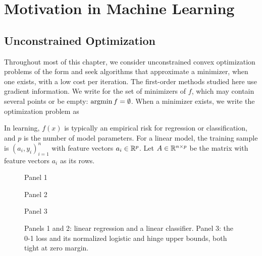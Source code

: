 
\section{Motivation in Machine Learning}

\subsection{Unconstrained Optimization}

Throughout most of this chapter, we consider unconstrained convex optimization problems of the form
and seek algorithms that approximate a minimizer, when one exists, with a low cost per iteration.
%
The first-order methods studied here use gradient information. We write
for the set of minimizers of $f$, which may contain several points or be empty: $\operatorname{argmin} f = \emptyset$. When a minimizer exists, we write the optimization problem as


In learning, $f(x)$ is typically an empirical risk for regression or classification, and $p$ is the number of model parameters. For a linear model, the training sample is $(a_i,y_i)_{i=1}^n$ with feature vectors $a_i \in \mathbb{R}^p$.
%
Let $A \in \mathbb{R}^{n \times p}$ be the matrix with feature vectors $a_i$ as its rows.


\begin{figure}[tbp]
\centering
{\small\sffamily\color{BookMuted}Panel 1\par}\smallskip
{}
\par\medskip
{\small\sffamily\color{BookMuted}Panel 2\par}\smallskip
{}
\par\medskip
{\small\sffamily\color{BookMuted}Panel 3\par}\smallskip
{}
\caption{Panels 1 and 2: linear regression and a linear classifier. Panel 3: the 0-1 loss and its normalized logistic and hinge upper bounds, both tight at zero margin.}
\label{fig-ml-ex}
\end{figure}


